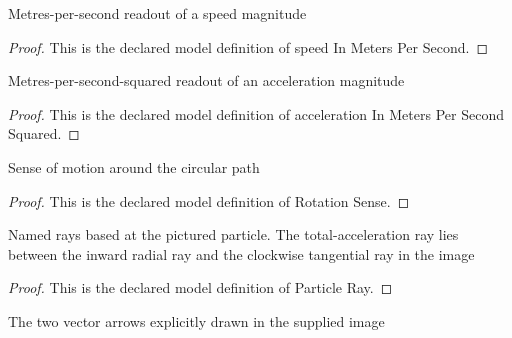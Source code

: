 \begin{definition}
  \label{def:physics:phyx-mini-0688:phyxminiproblems-problemphyxmini0688-speedinmeterspersecond}
  Metres-per-second readout of a speed magnitude
\end{definition}
\begin{proof}
  This is the declared model definition of speed In Meters Per Second.
\end{proof}
\begin{definition}
  \label{def:physics:phyx-mini-0688:phyxminiproblems-problemphyxmini0688-accelerationinmeterspersecondsquared}
  Metres-per-second-squared readout of an acceleration magnitude
\end{definition}
\begin{proof}
  This is the declared model definition of acceleration In Meters Per Second Squared.
\end{proof}
\begin{definition}
  \label{def:physics:phyx-mini-0688:phyxminiproblems-problemphyxmini0688-rotationsense}
  Sense of motion around the circular path
\end{definition}
\begin{proof}
  This is the declared model definition of Rotation Sense.
\end{proof}
\begin{definition}
  \label{def:physics:phyx-mini-0688:phyxminiproblems-problemphyxmini0688-particleray}
  Named rays based at the pictured particle. The total-acceleration ray lies between the inward radial ray and the clockwise tangential ray in the image
\end{definition}
\begin{proof}
  This is the declared model definition of Particle Ray.
\end{proof}
\begin{definition}
  \label{def:physics:phyx-mini-0688:phyxminiproblems-problemphyxmini0688-figurevector}
  The two vector arrows explicitly drawn in the supplied image
\end{definition}
